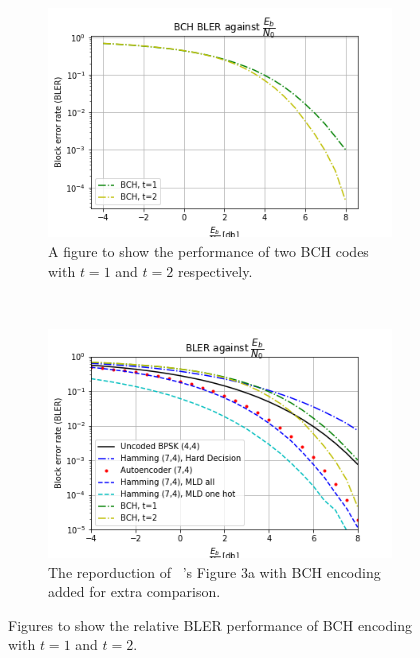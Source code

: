 \documentclass[12pt,onecolumn,letterpaper]{article}
\begin{document}
\begin{figure}[t!]
   \centering
  \begin{subfigure}[t]{0.45\textwidth}
       \centering
       \includegraphics[width=\linewidth]{figures/bch_t1_vs_t2.png}
       \caption{A figure to show the performance of two BCH codes with $t=1$ and $t=2$ respectively.}
       \label{fig:BchT1VsT2}
   \end{subfigure}
   ~
   \begin{subfigure}[t]{0.45\textwidth}
       \centering
       \includegraphics[width=\linewidth]{figures/o_shea_3a_bler_vs_eb_bch.png}
       \caption{The reporduction of ~\cite{oShea}'s Figure 3a with BCH encoding added for extra comparison.}
       \label{fig:OSheaFigure3aBch}
   \end{subfigure}
   \caption{Figures to show the relative BLER performance of BCH encoding with $t=1$ and $t=2$.}
   \label{fig:BchFigures}
\end{figure}
\end{document}
